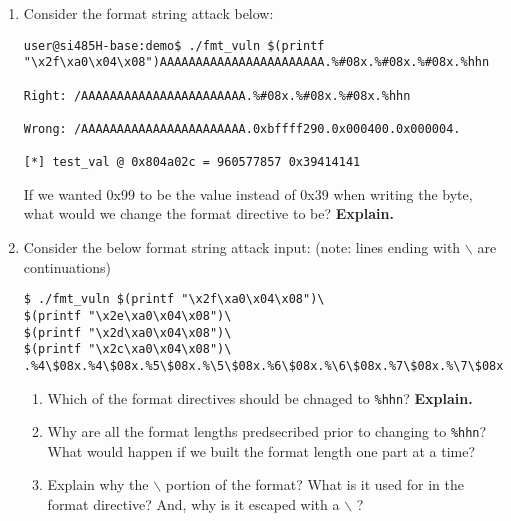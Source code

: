 \documentclass{article}[9pt]
\begin{document}
\begin{enumerate}
\item Consider the format string attack below:

\begin{verbatim}
user@si485H-base:demo$ ./fmt_vuln $(printf "\x2f\xa0\x04\x08")AAAAAAAAAAAAAAAAAAAAAAA.%#08x.%#08x.%#08x.%hhn

Right: /AAAAAAAAAAAAAAAAAAAAAAA.%#08x.%#08x.%#08x.%hhn

Wrong: /AAAAAAAAAAAAAAAAAAAAAAA.0xbffff290.0x000400.0x000004.

[*] test_val @ 0x804a02c = 960577857 0x39414141
\end{verbatim}

If we wanted 0x99 to be the value instead of 0x39 when writing
the byte, what would we change the format directive to be? \textbf{Explain.}

\item Consider the below format string attack input: (note: lines ending with $\backslash$ are continuations)

\begin{verbatim}
$ ./fmt_vuln $(printf "\x2f\xa0\x04\x08")\
$(printf "\x2e\xa0\x04\x08")\
$(printf "\x2d\xa0\x04\x08")\
$(printf "\x2c\xa0\x04\x08")\
.%4\$08x.%4\$08x.%5\$08x.%\5\$08x.%6\$08x.%\6\$08x.%7\$08x.%\7\$08x
\end{verbatim}

\begin{enumerate}
\item Which of the format directives should be chnaged to \texttt{\%hhn}? \textbf{Explain.}

\item Why are all the format lengths predsecribed prior to changing
to \texttt{\%hhn}? What would happen if we built the format length one
part at a time?

\item Explain why the $\backslash$ portion of the format? What is it used for
in the format directive? And, why is it escaped with a $\backslash$ ?
\end{enumerate}
\end{enumerate}
\end{document}
